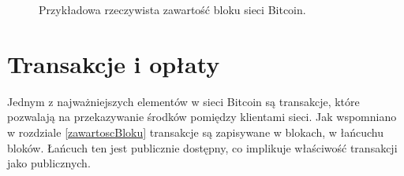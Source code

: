 \documentclass[12pt, twoside, final, openany]{mgr}
\begin{document}
\begin{figure}
	\begin{center}	
	\end{center}
	\caption{Przykładowa rzeczywista zawartość bloku sieci Bitcoin.}
	\label{fig:przykladowyBlok}
\end{figure}
\section{Transakcje i opłaty}
\label{transakcje}

\indent Jednym z najważniejszych elementów w sieci Bitcoin są transakcje, które pozwalają na przekazywanie środków pomiędzy klientami sieci. Jak wspomniano w rozdziale \ref{zawartoscBloku} transakcje są zapisywane w blokach, w łańcuchu bloków. Łańcuch ten jest publicznie dostępny, co implikuje właściwość transakcji jako publicznych. 
\end{document}
